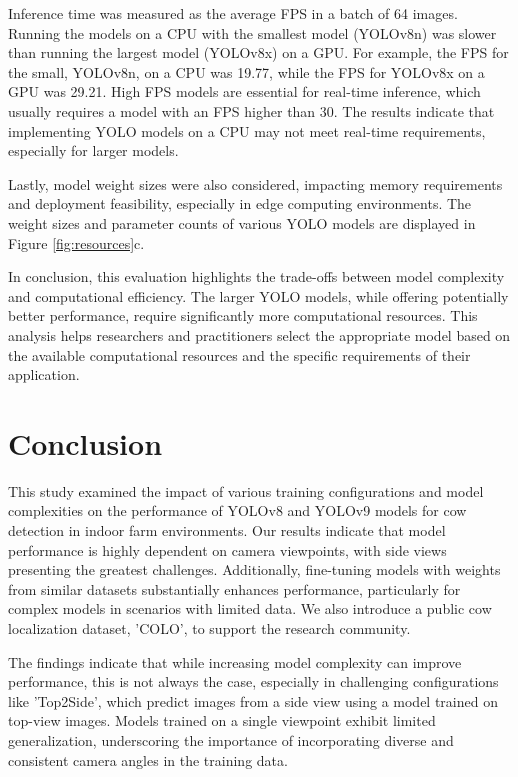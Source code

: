 Inference time was measured as the average FPS in a batch of 64 images. Running the models on a CPU with the smallest model (YOLOv8n) was slower than running the largest model (YOLOv8x) on a GPU. For example, the FPS for the small, YOLOv8n, on a CPU was 19.77, while the FPS for YOLOv8x on a GPU was 29.21. High FPS models are essential for real-time inference, which usually requires a model with an FPS higher than 30. The results indicate that implementing YOLO models on a CPU may not meet real-time requirements, especially for larger models.

Lastly, model weight sizes were also considered, impacting memory requirements and deployment feasibility, especially in edge computing environments. The weight sizes and parameter counts of various YOLO models are displayed in Figure \ref{fig:resources}c.

In conclusion, this evaluation highlights the trade-offs between model complexity and computational efficiency. The larger YOLO models, while offering potentially better performance, require significantly more computational resources. This analysis helps researchers and practitioners select the appropriate model based on the available computational resources and the specific requirements of their application.

\section{Conclusion}

This study examined the impact of various training configurations and model complexities on the performance of YOLOv8 and YOLOv9 models for cow detection in indoor farm environments. Our results indicate that model performance is highly dependent on camera viewpoints, with side views presenting the greatest challenges. Additionally, fine-tuning models with weights from similar datasets substantially enhances performance, particularly for complex models in scenarios with limited data. We also introduce a public cow localization dataset, 'COLO', to support the research community.

The findings indicate that while increasing model complexity can improve performance, this is not always the case, especially in challenging configurations like 'Top2Side', which predict images from a side view using a model trained on top-view images. Models trained on a single viewpoint exhibit limited generalization, underscoring the importance of incorporating diverse and consistent camera angles in the training data.

